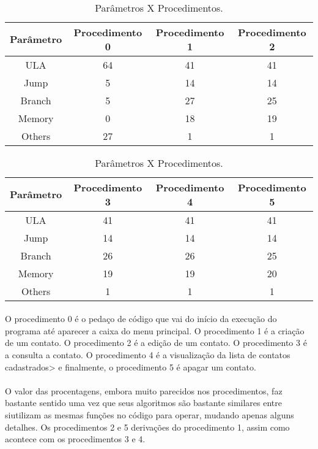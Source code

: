 \documentclass[12pt]{article}
\begin{document}
    \paragraph{}
        
\begin{table}[h!]
  \centering
  \caption{Parâmetros X Procedimentos.}
  \label{tab:table1}
  \begin{tabular}{c||c|c|c}
   
    Parâmetro & Procedimento 0 & Procedimento 1 & Procedimento 2 \\
    \hline
    ULA & 64 & 41 & 41\\
    \hline
    Jump & 5 & 14 & 14\\
    \hline
    Branch & 5 & 27 & 25\\
    \hline
    Memory & 0 & 18 & 19\\
    \hline
    Others & 27 & 1 & 1\\
  \end{tabular}
\end{table}


\begin{table}[h!]
  \centering
  \caption{Parâmetros X Procedimentos.}
  \label{tab:table2}
  \begin{tabular}{c||c|c|c}
   
    Parâmetro & Procedimento 3 & Procedimento 4 & Procedimento 5 \\
    \hline
    ULA & 41 & 41 & 41\\
    \hline
    Jump & 14 & 14 & 14\\
    \hline
    Branch & 26 & 26 & 25\\
    \hline
    Memory & 19 & 19 & 20\\
    \hline
    Others & 1 & 1 & 1\\
  \end{tabular}
\end{table}

    \paragraph{}
    O procedimento 0 é o pedaço de código que vai do início da execução do programa até aparecer a caixa do menu principal. O procedimento 1 é a criação de um contato. O procedimento 2 é a edição de um contato. O procedimento 3 é a consulta a contato. O procedimento 4 é a visualização da lista de contatos cadastrados> e finalmente, o procedimento 5 é apagar um contato. 
	\paragraph{}
	O valor das procentagens, embora muito parecidos nos procedimentos, faz bastante sentido uma vez que seus algoritmos são bastante similares entre siutilizam as mesmas funções no código para operar, mudando apenas alguns detalhes. Os procedimentos 2 e 5 derivações do procedimento 1, assim como acontece com os procedimentos 3 e 4.
\end{document}
